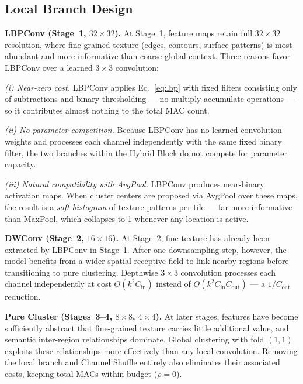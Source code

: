 \documentclass[conference]{IEEEtran}
\begin{document}
\subsection{Local Branch Design}
\label{ssec:local}

\noindent\textbf{LBPConv (Stage~1, $32\!\times\!32$).}
At Stage~1, feature maps retain full $32\!\times\!32$ resolution,
where fine-grained texture (edges, contours, surface patterns) is
most abundant and more informative than coarse global context. Three
reasons favor LBPConv over a learned $3\!\times\!3$ convolution:

\textit{(i) Near-zero cost.} LBPConv applies
Eq.~\eqref{eq:lbp} with fixed filters consisting only of subtractions
and binary thresholding --- no multiply-accumulate operations --- so it
contributes almost nothing to the total MAC count.

\textit{(ii) No parameter competition.} Because LBPConv has no
learned convolution weights and processes each channel independently
with the same fixed binary filter, the two branches within the Hybrid
Block do not compete for parameter capacity.

\textit{(iii) Natural compatibility with AvgPool.} LBPConv produces
near-binary activation maps. When cluster centers are proposed via
AvgPool over these maps, the result is a \emph{soft histogram} of
texture patterns per tile --- far more informative than MaxPool, which
collapses to 1 whenever any location is active.

\noindent\textbf{DWConv (Stage~2, $16\!\times\!16$).}
At Stage~2, fine texture has already been extracted by LBPConv in
Stage~1. After one downsampling step, however, the model benefits from
a wider spatial receptive field to link nearby regions before
transitioning to pure clustering. Depthwise $3\!\times\!3$
convolution processes each channel independently at cost
$O(k^2 C_{\mathrm{in}})$ instead of
$O(k^2 C_{\mathrm{in}} C_{\mathrm{out}})$ --- a $1/C_{\mathrm{out}}$
reduction.

\noindent\textbf{Pure Cluster (Stages~3--4, $8\!\times\!8$,
$4\!\times\!4$).}
At later stages, features have become sufficiently abstract that
fine-grained texture carries little additional value, and semantic
inter-region relationships dominate. Global clustering with fold
$(1,1)$ exploits these relationships more effectively than any local
convolution. Removing the local branch and Channel Shuffle entirely
also eliminates their associated costs, keeping total MACs within
budget ($\rho{=}0$).
\end{document}
